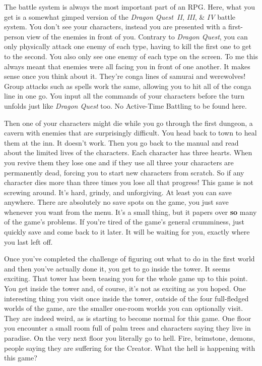\documentclass{book}
\begin{document}
The battle system is always the most important part of an RPG. Here, what you get is a somewhat gimped version of the \emph{Dragon Quest II}, \emph{III}, \& \emph{IV} battle system. You don’t see your characters, instead you are presented with a first-person view of the enemies in front of you. Contrary to \emph{Dragon Quest}, you can only physically attack one enemy of each type, having to kill the first one to get to the second. You also only see one enemy of each type on the screen. To me this always meant that enemies were all facing you in front of one another. It makes sense once you think about it. They’re conga lines of samurai and werewolves! Group attacks such as spells work the same, allowing you to hit all of the conga line in one go. You input all the commands of your characters before the turn unfolds just like \emph{Dragon Quest} too. No Active-Time Battling to be found here.

Then one of your characters might die while you go through the first dungeon, a cavern with enemies that are surprisingly difficult. You head back to town to heal them at the inn. It doesn’t work. Then you go back to the manual and read about the limited lives of the characters. Each character has three hearts. When you revive them they lose one and if they use all three your characters are permanently dead, forcing you to start new characters from scratch. So if any character dies more than three times you lose all that progress! This game is not screwing around. It’s hard, grindy, and unforgiving. At least you can save anywhere. There are absolutely no save spots on the game, you just save whenever you want from the menu. It’s a small thing, but it papers over \textbf{so} many of the game’s problems. If you’re tired of the game’s general crumminess, just quickly save and come back to it later. It will be waiting for you, exactly where you last left off.

Once you’ve completed the challenge of figuring out what to do in the first world and then you’ve actually done it, you get to go inside the tower. It seems exciting. That tower has been teasing you for the whole game up to this point. You get inside the tower and, of course, it’s not as exciting as you hoped. One interesting thing you visit once inside the tower, outside of the four full-fledged worlds of the game, are the smaller one-room worlds you can optionally visit. They are indeed weird, as is starting to become normal for this game. One floor you encounter a small room full of palm trees and characters saying they live in paradise. On the very next floor you literally go to hell. Fire, brimstone, demons, people saying they are suffering for the Creator. What the hell is happening with this game?
\end{document}

